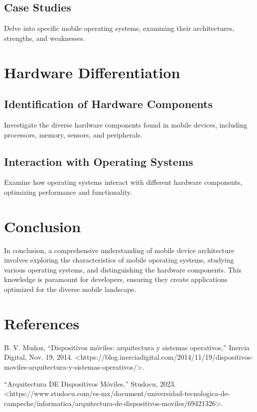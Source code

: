 \documentclass[conference]{IEEEtran}
\begin{document}
	\subsection{Case Studies}
	Delve into specific mobile operating systems, examining their architectures, strengths, and weaknesses.
	
	\section{Hardware Differentiation}
	\subsection{Identification of Hardware Components}
	Investigate the diverse hardware components found in mobile devices, including processors, memory, sensors, and peripherals.
	
	\subsection{Interaction with Operating Systems}
	Examine how operating systems interact with different hardware components, optimizing performance and functionality.
	
	\section{Conclusion}
	In conclusion, a comprehensive understanding of mobile device architecture involves exploring the characteristics of mobile operating systems, studying various operating systems, and distinguishing the hardware components. This knowledge is paramount for developers, ensuring they create applications optimized for the diverse mobile landscape.
	
	\section{References}
	\begin{thebibliography}{1}
		 B. V. Muñoz, “Dispositivos móviles: arquitectura y sistemas operativos,” Inercia Digital, Nov. 19, 2014. \textless https://blog.inerciadigital.com/2014/11/19/dispositivos-moviles-arquitectura-y-sistemas-operativos/\textgreater.
		
		 “Arquitectura DE Dispositivos Móviles,” Studocu, 2023. \textless https://www.studocu.com/es-mx/document/universidad-tecnologica-de-campeche/informatica/arquitectura-de-dispositivos-moviles/69421326\textgreater.
	\end{thebibliography}
	
\end{document}
